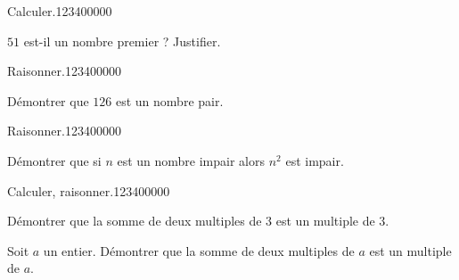 \begin{pageAD}
\begin{ExoCad}{Calculer.}{1234}{0}{0}{0}{0}{0}

$51$ est-il un nombre premier ? Justifier. 


\end{ExoCad}


\begin{ExoCad}{Raisonner.}{1234}{0}{0}{0}{0}{0}

Démontrer que $126$ est un nombre pair.


\end{ExoCad}



\begin{ExoCad}{Raisonner.}{1234}{0}{0}{0}{0}{0}

Démontrer que si $n$ est un nombre impair alors $n^2$ est impair.


\end{ExoCad}



\begin{ExoCad}{Calculer, raisonner.}{1234}{0}{0}{0}{0}{0}

Démontrer que la somme de deux multiples de $3$ est un multiple de $3$. 

Soit $a$ un entier. Démontrer que la somme de deux multiples de $a$ est un multiple de $a$. 

\end{ExoCad}




\end{pageAD}
